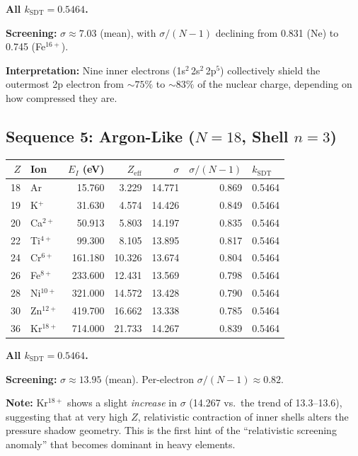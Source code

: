 \textbf{All $k_{\text{SDT}} = 0.5464$.}

\textbf{Screening:} $\sigma \approx 7.03$ (mean), with $\sigma/(N{-}1)$ declining from 0.831 (Ne) to 0.745 (Fe$^{16+}$).

\textbf{Interpretation:} Nine inner electrons (1s$^2$\,2s$^2$\,2p$^5$) collectively shield the outermost 2p electron from $\sim 75\%$ to $\sim 83\%$ of the nuclear charge, depending on how compressed they are.


\subsection{Sequence 5: Argon-Like ($N = 18$, Shell $n = 3$)}

\begin{center}
\small
\begin{tabular}{rlrrrrl}
\hline
$Z$ & Ion & $E_I$ (eV) & $Z_{\text{eff}}$ & $\sigma$ & $\sigma/(N{-}1)$ & $k_{\text{SDT}}$ \\
\hline
18 & Ar           &   15.760 &  3.229 & 14.771 & 0.869 & 0.5464 \\
19 & K$^+$        &   31.630 &  4.574 & 14.426 & 0.849 & 0.5464 \\
20 & Ca$^{2+}$    &   50.913 &  5.803 & 14.197 & 0.835 & 0.5464 \\
22 & Ti$^{4+}$    &   99.300 &  8.105 & 13.895 & 0.817 & 0.5464 \\
24 & Cr$^{6+}$    &  161.180 & 10.326 & 13.674 & 0.804 & 0.5464 \\
26 & Fe$^{8+}$    &  233.600 & 12.431 & 13.569 & 0.798 & 0.5464 \\
28 & Ni$^{10+}$   &  321.000 & 14.572 & 13.428 & 0.790 & 0.5464 \\
30 & Zn$^{12+}$   &  419.700 & 16.662 & 13.338 & 0.785 & 0.5464 \\
36 & Kr$^{18+}$   &  714.000 & 21.733 & 14.267 & 0.839 & 0.5464 \\
\hline
\end{tabular}
\end{center}

\textbf{All $k_{\text{SDT}} = 0.5464$.}

\textbf{Screening:} $\sigma \approx 13.95$ (mean).  Per-electron $\sigma/(N{-}1) \approx 0.82$.

\textbf{Note:} Kr$^{18+}$ shows a slight \emph{increase} in $\sigma$ (14.267 vs.\ the trend of 13.3--13.6), suggesting that at very high $Z$, relativistic contraction of inner shells alters the pressure shadow geometry.  This is the first hint of the ``relativistic screening anomaly'' that becomes dominant in heavy elements.


